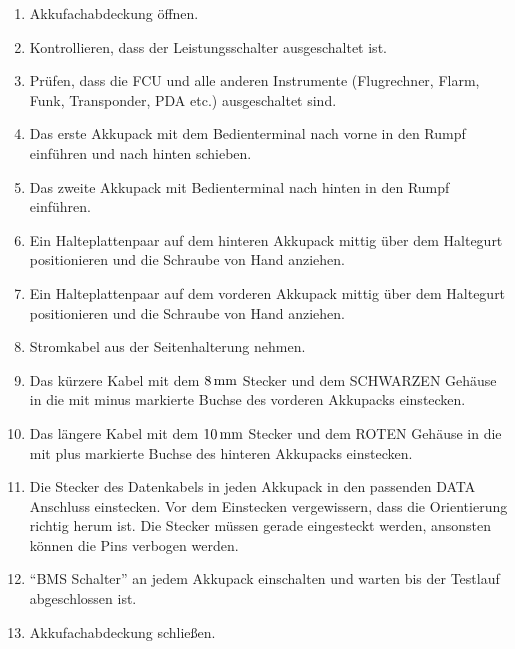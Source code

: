 \begin{enumerate}
\item Akkufachabdeckung öffnen.
\item Kontrollieren, dass der Leistungsschalter ausgeschaltet ist.
\item Prüfen, dass die FCU und alle anderen Instrumente (Flugrechner, Flarm, Funk,
Transponder, PDA etc.) ausgeschaltet sind.
\item Das erste Akkupack mit dem Bedienterminal nach vorne in den Rumpf einführen und nach hinten schieben.
\item Das zweite Akkupack mit Bedienterminal nach hinten in den Rumpf einführen.
\item Ein Halteplattenpaar auf dem hinteren Akkupack mittig über dem Haltegurt positionieren und die Schraube von Hand anziehen.
\item Ein Halteplattenpaar auf dem vorderen Akkupack mittig über dem Haltegurt positionieren und die Schraube von Hand anziehen.
\item Stromkabel aus der Seitenhalterung nehmen.
\item Das kürzere Kabel mit dem $\unit[8]{mm}$ Stecker und dem SCHWARZEN Gehäuse in die mit minus markierte Buchse des vorderen Akkupacks einstecken.
\item Das längere Kabel mit dem $\unit[10]{mm}$ Stecker und dem ROTEN Gehäuse in die mit plus markierte Buchse des hinteren Akkupacks einstecken.
\item Die Stecker des Datenkabels in jeden Akkupack in den passenden DATA Anschluss einstecken.
Vor dem Einstecken vergewissern, dass die Orientierung richtig herum ist.
Die Stecker müssen gerade eingesteckt werden, ansonsten können die Pins verbogen werden.
\item “BMS Schalter” an jedem Akkupack einschalten und warten bis der Testlauf abgeschlossen ist.
\item Akkufachabdeckung schließen.
\end{enumerate}

